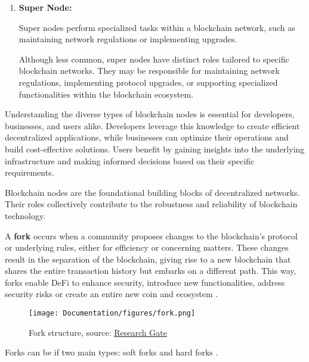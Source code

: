 \begin{enumerate}
    \item \textbf{Super Node:}

    Super nodes perform specialized tasks within a blockchain network, such as maintaining network regulations or implementing upgrades.

    Although less common, super nodes have distinct roles tailored to specific blockchain networks. They may be responsible for maintaining network regulations, implementing protocol upgrades, or supporting specialized functionalities within the blockchain ecosystem.\newline
\end{enumerate}

Understanding the diverse types of blockchain nodes is essential for developers, businesses, and users alike. Developers leverage this knowledge to create efficient decentralized applications, while businesses can optimize their operations and build cost-effective solutions. Users benefit by gaining insights into the underlying infrastructure and making informed decisions based on their specific requirements.\newline

Blockchain nodes are the foundational building blocks of decentralized networks. Their roles collectively contribute to the robustness and reliability of blockchain technology.\newline


A \textbf{fork} occurs when a community proposes changes to the blockchain's protocol or underlying rules, either for efficiency or concerning matters. These changes result in the separation of the blockchain, giving rise to a new blockchain that shares the entire transaction history but embarks on a different path. This way, forks enable DeFi to enhance security, introduce new functionalities, address security risks or create an entire new coin and ecosystem \cite{fork}.


\begin{figure}[htbp]
	\centering
	\texttt{[image: Documentation/figures/fork.png]}  %
	\caption{Fork structure, source: \href{https://www.researchgate.net/figure/Fork-structure-in-a-blockchain_fig2_342017074}{Research Gate}}
	\label{fig:fork}
\end{figure}

Forks can be if two main types: soft forks and hard forks \cite{fork}.

